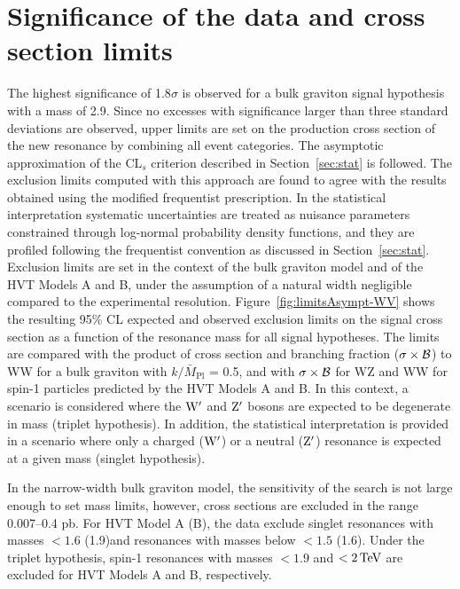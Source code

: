 \section{Significance of the data and cross section limits}

The highest significance of 1.8$\sigma$ is observed for a bulk graviton signal hypothesis with a mass of 2.9\TeV.
Since no excesses with significance larger than three standard deviations are observed, upper limits are set on the production cross section of the new resonance by combining all event categories.
The asymptotic approximation of the $\mathrm{CL}_s$ criterion described in Section~\ref{sec:stat} is followed.
The exclusion limits computed with this approach are found to agree with the results obtained using the modified frequentist prescription.
In the statistical interpretation systematic uncertainties are treated as nuisance parameters constrained through log-normal probability density functions,
and they are profiled following the frequentist convention as discussed in Section~\ref{sec:stat}.\\

Exclusion limits are set in the context of the bulk graviton model and of the HVT Models A and B, under the assumption of a natural width negligible compared to the experimental resolution.
Figure~\ref{fig:limitsAsympt-WV} shows the resulting 95\% CL expected and observed exclusion limits on the signal cross section as a function of the resonance mass for all signal hypotheses.
The limits are compared with the product of cross section and branching fraction ($\sigma\times\cal{B}$) to WW for a bulk graviton with $k/\bar{M}_\mathrm{Pl}$ = 0.5,
and with $\sigma\times\cal{B}$ for WZ and WW for spin-1 particles predicted by the HVT Models A and B.
In this context, a scenario is considered where the $\mathrm{W}^\prime$ and $\mathrm{Z}^\prime$ bosons are expected to be degenerate in mass (triplet hypothesis).
In addition, the statistical interpretation is provided in a scenario where only a charged ($\mathrm{W}^\prime$) or a neutral ($\mathrm{Z}^\prime$) resonance is expected at a given mass (singlet hypothesis).

In the narrow-width bulk graviton model, the sensitivity of the search is not large enough to set mass limits, however, cross sections are excluded in the range 0.007--0.4 pb.
For HVT Model A (B), the data exclude singlet \Wpr resonances with masses $< 1.6$ (1.9)\TeV and \Zpr resonances with masses below $< 1.5$ (1.6)\TeV.
Under the triplet hypothesis, spin-1 resonances with masses $< 1.9$ and $< 2\,\text{Te\hspace{-.08em}V}$ are excluded for HVT Models A and B, respectively.

